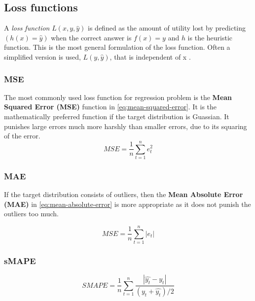 \subsection{Loss functions}
\label{loss-functions}
A \textit{loss function} $L(x, y, \hat{y})$ is defined as the amount of utility lost by predicting 
$(h(x)=\hat{y})$ when the correct answer is $f(x) = y$ and $h$ is the heuristic function.
This is the most general formulation of the loss function. Often a simplified version is used,
$L(y, \hat{y})$, that is independent of x \cite{Russel2012}.
\subsubsection{MSE}
The most commonly used loss function for regression problem is the 
\textbf{Mean Squared Error (MSE)} function in \autoref{eq:mean-squared-error}.
It is the mathematically preferred function if the target distribution is Guassian.
It punishes large errors much more harshly than smaller errors, due to its squaring of the error.
\begin{equation}
  \label{eq:mean-squared-error}
  MSE = \frac{1}{n} \sum_{t=1}^n e_t^2
\end{equation}

\subsubsection{MAE}
If the target distribution consists of outliers, then the 
\textbf{Mean Absolute Error (MAE)} in \autoref{eq:mean-absolute-error} is more appropriate
as it does not punish the outliers too much.

\begin{equation}
  \label{eq:mean-absolute-error}
  MSE = \frac{1}{n} \sum_{t=1}^n |e_t|
\end{equation}

\subsubsection{sMAPE}
\begin{equation}
  \label{eq:sMape}
  SMAPE = \frac{1}{n} \sum_{t=1}^n \frac{|\hat{y_t} - y_t|}{(y_t + \hat{y_t}) / 2}
\end{equation}


